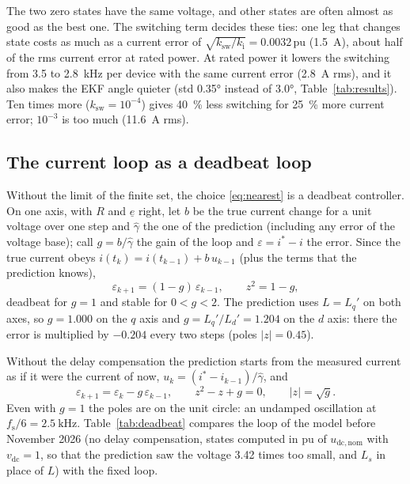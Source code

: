 \documentclass[11pt,a4paper]{scrartcl}
\newcommand{\ped}[1]{_{\mathrm{#1}}}
\newcommand{\pun}{\,\mathrm{pu}}
\begin{document}
\begin{onehalfspace}
The two zero states have the same voltage, and other states are often almost as good as the best one. The switching term decides these ties: one leg that changes state costs as much as a current error of $\sqrt{k\ped{sw}/k\ped{i}} = 0.0032\pun$ (\SI{1.5}{\ampere}), about half of the rms current error at rated power. At rated power it lowers the switching from 3.5 to \SI{2.8}{\kilo\hertz} per device with the same current error (\SI{2.8}{\ampere} rms), and it also makes the EKF angle quieter (std \ang{0.35} instead of \ang{3.0}, Table~\ref{tab:results}). Ten times more ($k\ped{sw} = 10^{-4}$) gives \SI{40}{\percent} less switching for \SI{25}{\percent} more current error; $10^{-3}$ is too much (\SI{11.6}{\ampere} rms).

\subsection{The current loop as a deadbeat loop}
\label{sec:deadbeat}

Without the limit of the finite set, the choice \eqref{eq:nearest} is a deadbeat controller. On one axis, with $R$ and $\underline{e}$ right, let $b$ be the true current change for a unit voltage over one step and $\hat\gamma$ the one of the prediction (including any error of the voltage base); call $g = b/\hat\gamma$ the gain of the loop and $\varepsilon = i^* - i$ the error. Since the true current obeys $i(t_k) = i(t_{k-1}) + b\,u_{k-1}$ (plus the terms that the prediction knows),
\begin{equation}
	\varepsilon_{k+1} = (1 - g)\,\varepsilon_{k-1}, \qquad z^2 = 1 - g ,
	\label{eq:deadbeat}
\end{equation}
deadbeat for $g = 1$ and stable for $0 < g < 2$. The prediction uses $L = L_q'$ on both axes, so $g = 1.000$ on the $q$ axis and $g = L_q'/L_d' = 1.204$ on the $d$ axis: there the error is multiplied by $-0.204$ every two steps (poles $|z| = 0.45$).

Without the delay compensation the prediction starts from the measured current as if it were the current of now, $u_k = (i^* - i_{k-1})/\hat\gamma$, and
\begin{equation}
	\varepsilon_{k+1} = \varepsilon_k - g\,\varepsilon_{k-1}, \qquad z^2 - z + g = 0, \qquad |z| = \sqrt g .
	\label{eq:nocomp}
\end{equation}
Even with $g = 1$ the poles are on the unit circle: an undamped oscillation at $f\ped{s}/6 = \SI{2.5}{\kilo\hertz}$. Table~\ref{tab:deadbeat} compares the loop of the model before November 2026 (no delay compensation, states computed in pu of $u\ped{dc,nom}$ with $v\ped{dc} = 1$, so that the prediction saw the voltage 3.42 times too small, and $L_s$ in place of $L$) with the fixed loop.


\end{onehalfspace}
\end{document}
